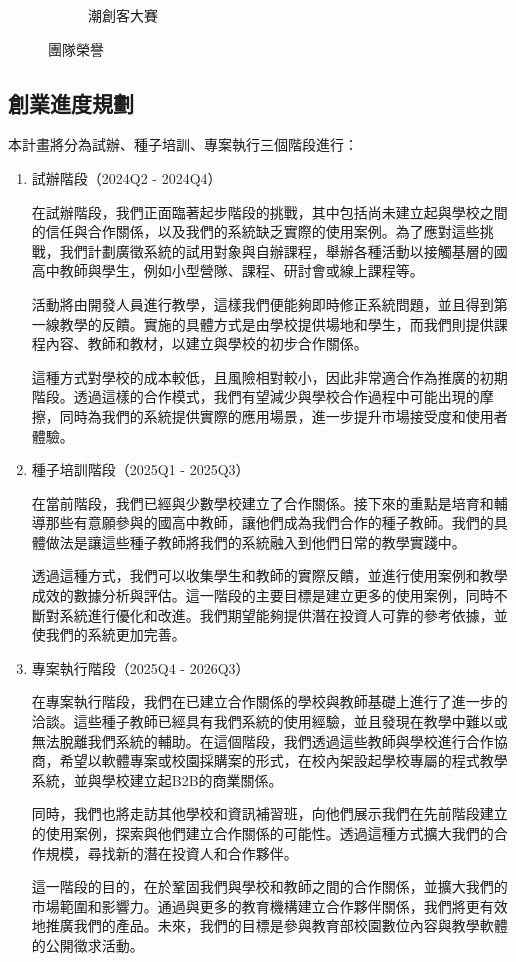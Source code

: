 \begin{figure}[H]
\begin{subfigure}{0.31\linewidth}
    \caption{潮創客大賽}
    \label{fig:Awards-2}
  \end{subfigure}
  \caption{團隊榮譽}
\end{figure}

\subsection{創業進度規劃}
\label{sec:plan}

本計畫將分為試辦、種子培訓、專案執行三個階段進行：

\begin{enumerate}
  \setlength{\parindent}{2em}
  \item 試辦階段（2024Q2 - 2024Q4）
  \par 在試辦階段，我們正面臨著起步階段的挑戰，其中包括尚未建立起與學校之間的信任與合作關係，以及我們的系統缺乏實際的使用案例。為了應對這些挑戰，我們計劃廣徵系統的試用對象與自辦課程，舉辦各種活動以接觸基層的國高中教師與學生，例如小型營隊、課程、研討會或線上課程等。
  \par 活動將由開發人員進行教學，這樣我們便能夠即時修正系統問題，並且得到第一線教學的反饋。實施的具體方式是由學校提供場地和學生，而我們則提供課程內容、教師和教材，以建立與學校的初步合作關係。
  \par 這種方式對學校的成本較低，且風險相對較小，因此非常適合作為推廣的初期階段。透過這樣的合作模式，我們有望減少與學校合作過程中可能出現的摩擦，同時為我們的系統提供實際的應用場景，進一步提升市場接受度和使用者體驗。
  \item 種子培訓階段（2025Q1 - 2025Q3）
  \par 在當前階段，我們已經與少數學校建立了合作關係。接下來的重點是培育和輔導那些有意願參與的國高中教師，讓他們成為我們合作的種子教師。我們的具體做法是讓這些種子教師將我們的系統融入到他們日常的教學實踐中。
  \par 透過這種方式，我們可以收集學生和教師的實際反饋，並進行使用案例和教學成效的數據分析與評估。這一階段的主要目標是建立更多的使用案例，同時不斷對系統進行優化和改進。我們期望能夠提供潛在投資人可靠的參考依據，並使我們的系統更加完善。
  \item 專案執行階段（2025Q4 - 2026Q3）
  \par 在專案執行階段，我們在已建立合作關係的學校與教師基礎上進行了進一步的洽談。這些種子教師已經具有我們系統的使用經驗，並且發現在教學中難以或無法脫離我們系統的輔助。在這個階段，我們透過這些教師與學校進行合作協商，希望以軟體專案或校園採購案的形式，在校內架設起學校專屬的程式教學系統，並與學校建立起B2B的商業關係。
  \par 同時，我們也將走訪其他學校和資訊補習班，向他們展示我們在先前階段建立的使用案例，探索與他們建立合作關係的可能性。透過這種方式擴大我們的合作規模，尋找新的潛在投資人和合作夥伴。
  \par 這一階段的目的，在於鞏固我們與學校和教師之間的合作關係，並擴大我們的市場範圍和影響力。通過與更多的教育機構建立合作夥伴關係，我們將更有效地推廣我們的產品。未來，我們的目標是參與教育部校園數位內容與教學軟體的公開徵求活動。
\end{enumerate}